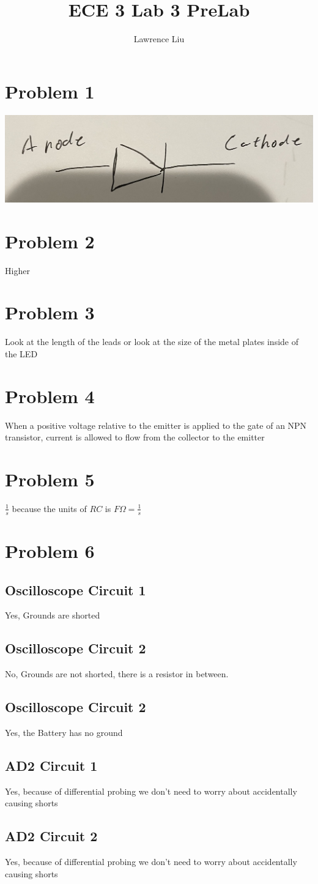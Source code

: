 \documentclass[12pt]{article}
\title{ECE 3 Lab 3 PreLab}
\author{Lawrence Liu}
\begin{document}
\maketitle

\section*{Problem 1}
\includegraphics[scale=0.5]{Diode}
\section*{Problem 2}
Higher
\section*{Problem 3}
Look at the length of the leads or look at the size of the metal plates inside of the LED
\section*{Problem 4}
When a positive voltage relative to the emitter is applied to the gate of an NPN transistor, current is allowed to flow from the collector to the emitter
\section*{Problem 5}
$\frac{1}{s}$ because the units of $RC$ is $F\Omega=\frac{1}{s}$
\section*{Problem 6}
\subsection*{Oscilloscope Circuit 1}
Yes, Grounds are shorted
\subsection*{Oscilloscope Circuit 2}
No, Grounds are not shorted, there is a resistor in between. 
\subsection*{Oscilloscope Circuit 2}
Yes, the Battery has no ground
\subsection*{AD2 Circuit 1}
Yes, because of differential probing we don't need to worry about accidentally causing shorts
\subsection*{AD2 Circuit 2}
Yes, because of differential probing we don't need to worry about accidentally causing shorts
\end{document}
